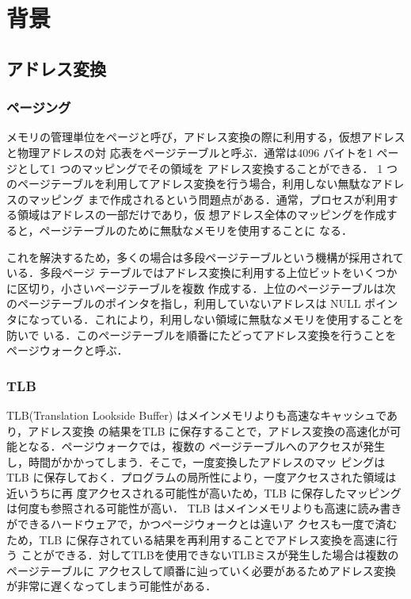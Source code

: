 \section{背景} \label{section:background}
\subsection{アドレス変換}
\subsubsection{ページング}
メモリの管理単位をページと呼び，アドレス変換の際に利用する，仮想アドレスと物理アドレスの対
応表をページテーブルと呼ぶ．通常は4096 バイトを1 ページとして1 つのマッピングでその領域を
アドレス変換することができる．
1 つのページテーブルを利用してアドレス変換を行う場合，利用しない無駄なアドレスのマッピング
まで作成されるという問題点がある．通常，プロセスが利用する領域はアドレスの一部だけであり，仮
想アドレス全体のマッピングを作成すると，ページテーブルのために無駄なメモリを使用することに
なる．

これを解決するため，多くの場合は多段ページテーブルという機構が採用されている\cite{page-table-management}．多段ページ
テーブルではアドレス変換に利用する上位ビットをいくつかに区切り，小さいページテーブルを複数
作成する．上位のページテーブルは次のページテーブルのポインタを指し，利用していないアドレスは
NULL ポインタになっている．これにより，利用しない領域に無駄なメモリを使用することを防いで
いる．このページテーブルを順番にたどってアドレス変換を行うことをページウォークと呼ぶ．

\subsubsection{TLB}
TLB(Translation Lookside Buffer) はメインメモリよりも高速なキャッシュであり，アドレス変換
の結果をTLB に保存することで，アドレス変換の高速化が可能となる．ページウォークでは，複数の
ページテーブルへのアクセスが発生し，時間がかかってしまう．そこで，一度変換したアドレスのマッ
ピングはTLB に保存しておく．プログラムの局所性により，一度アクセスされた領域は近いうちに再
度アクセスされる可能性が高いため，TLB に保存したマッピングは何度も参照される可能性が高い．
TLB はメインメモリよりも高速に読み書きができるハードウェアで，かつページウォークとは違いア
クセスも一度で済むため，TLB に保存されている結果を再利用することでアドレス変換を高速に行う
ことができる．対してTLBを使用できないTLBミスが発生した場合は複数のページテーブルに
アクセスして順番に辿っていく必要があるためアドレス変換が非常に遅くなってしまう可能性がある\cite{intel-manual}．

